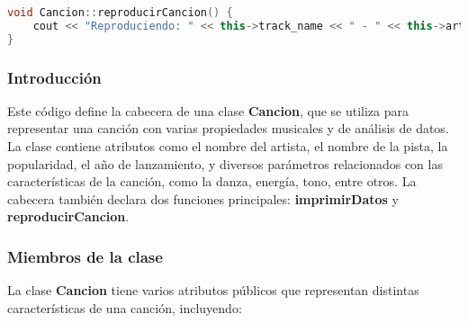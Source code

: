 \documentclass[12pt]{article}
\begin{document}
\begin{flushleft}
\begin{lstlisting}[language=C++, style=mystyle, caption={Código de un Clase Canción}]
void Cancion::reproducirCancion() {
    cout << "Reproduciendo: " << this->track_name << " - " << this->artist_name << endl;
}
            \end{lstlisting}

            \subsubsection{Introducción}
            
                \noindent\hspace*{4em}Este código define la cabecera de una clase \textbf{Cancion}, que se utiliza para representar una canción con varias propiedades musicales y de análisis de datos. La clase contiene atributos como el nombre del artista, el nombre de la pista, la popularidad, el año de lanzamiento, y diversos parámetros relacionados con las características de la canción, como la danza, energía, tono, entre otros. La cabecera también declara dos funciones principales: \textbf{imprimirDatos} y \textbf{reproducirCancion}.
            
            \subsubsection{Miembros de la clase}
            
                \noindent\hspace*{4em}La clase \textbf{Cancion} tiene varios atributos públicos que representan distintas características de una canción, incluyendo:
                

\end{flushleft}
\end{document}
